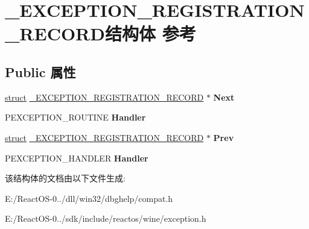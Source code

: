 \hypertarget{struct___e_x_c_e_p_t_i_o_n___r_e_g_i_s_t_r_a_t_i_o_n___r_e_c_o_r_d}{}\section{\+\_\+\+E\+X\+C\+E\+P\+T\+I\+O\+N\+\_\+\+R\+E\+G\+I\+S\+T\+R\+A\+T\+I\+O\+N\+\_\+\+R\+E\+C\+O\+R\+D结构体 参考}
\label{struct___e_x_c_e_p_t_i_o_n___r_e_g_i_s_t_r_a_t_i_o_n___r_e_c_o_r_d}
\subsection*{Public 属性}
\begin{DoxyCompactItemize}
\item 
\mbox{\label{struct___e_x_c_e_p_t_i_o_n___r_e_g_i_s_t_r_a_t_i_o_n___r_e_c_o_r_d_a12f018be63595cf70f4ec69e36efe1e3}} 
\hyperlink{interfacestruct}{struct} \hyperlink{struct___e_x_c_e_p_t_i_o_n___r_e_g_i_s_t_r_a_t_i_o_n___r_e_c_o_r_d}{\+\_\+\+E\+X\+C\+E\+P\+T\+I\+O\+N\+\_\+\+R\+E\+G\+I\+S\+T\+R\+A\+T\+I\+O\+N\+\_\+\+R\+E\+C\+O\+RD} $\ast$ {\bfseries Next}
\item 
\mbox{\label{struct___e_x_c_e_p_t_i_o_n___r_e_g_i_s_t_r_a_t_i_o_n___r_e_c_o_r_d_aab0d0dc26abd0589a215186eeb2b541d}} 
P\+E\+X\+C\+E\+P\+T\+I\+O\+N\+\_\+\+R\+O\+U\+T\+I\+NE {\bfseries Handler}
\item 
\mbox{\label{struct___e_x_c_e_p_t_i_o_n___r_e_g_i_s_t_r_a_t_i_o_n___r_e_c_o_r_d_ae4a195350e55b5376595cb33534cea28}} 
\hyperlink{interfacestruct}{struct} \hyperlink{struct___e_x_c_e_p_t_i_o_n___r_e_g_i_s_t_r_a_t_i_o_n___r_e_c_o_r_d}{\+\_\+\+E\+X\+C\+E\+P\+T\+I\+O\+N\+\_\+\+R\+E\+G\+I\+S\+T\+R\+A\+T\+I\+O\+N\+\_\+\+R\+E\+C\+O\+RD} $\ast$ {\bfseries Prev}
\item 
\mbox{\label{struct___e_x_c_e_p_t_i_o_n___r_e_g_i_s_t_r_a_t_i_o_n___r_e_c_o_r_d_a76fc808b7d30f73a5ef7aaddad5ccdc5}} 
P\+E\+X\+C\+E\+P\+T\+I\+O\+N\+\_\+\+H\+A\+N\+D\+L\+ER {\bfseries Handler}
\end{DoxyCompactItemize}


该结构体的文档由以下文件生成\+:\begin{DoxyCompactItemize}
\item 
E\+:/\+React\+O\+S-\/0../dll/win32/dbghelp/compat.\+h\item 
E\+:/\+React\+O\+S-\/0../sdk/include/reactos/wine/exception.\+h\end{DoxyCompactItemize}
